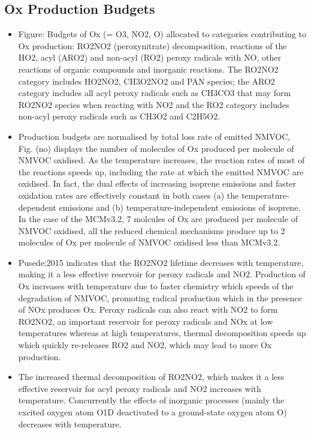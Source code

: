 \documentclass[11pt,a4paper]{article}
\begin{document}
\subsection{Ox Production Budgets}
\begin{itemize}
    \item Figure: Budgets of Ox (= O3, NO2, O) allocated to categories contributing to Ox production: RO2NO2 (peroxynitrate) decomposition, reactions of the HO2, acyl (ARO2) and non-acyl (RO2) peroxy radicals with NO, other reactions of organic compounds and inorganic reactions. The RO2NO2 category includes HO2NO2, CH3O2NO2 and PAN species; the ARO2 category includes all acyl peroxy radicals such as CH3CO3 that may form RO2NO2 species when reacting with NO2 and the RO2 category includes non-acyl peroxy radicals such as CH3O2 and C2H5O2.
    \item Production budgets are normalised by total loss rate of emitted NMVOC, Fig. (no) displays the number of molecules of Ox produced per molecule of NMVOC oxidised. As the temperature increases, the reaction rates of most of the reactions speeds up, including the rate at which the emitted NMVOC are oxidised. In fact, the dual effects of increasing isoprene emissions and faster oxidation rates are effectively constant in both cases (a) the temperature-dependent emissions and (b) temperature-independent emissions of isoprene. In the case of the MCMv3.2, 7 molcules of Ox are produced per molecule of NMVOC oxidised, all the reduced chemical mechanisms produce up to 2 molecules of Ox per molecule of NMVOC oxidised less than MCMv3.2.
    \item Pusede:2015 indicates that the RO2NO2 lifetime decreases with temperature, making it a less effective reservoir for peroxy radicals and NO2. Production of Ox increases with temperature due to faster chemistry which speeds of the degradation of NMVOC, promoting radical production which in the presence of NOx produces Ox. Peroxy radicals can also react with NO2 to form RO2NO2, an important reservoir for peroxy radicals and NOx at low temperatures whereas at high temperatures, thermal decomposition speeds up which quickly re-releases RO2 and NO2, which may lead to more Ox production.
    \item The increased thermal decomposition of RO2NO2, which makes it a less effective reservoir for acyl peroxy radicals and NO2 increases with temperature. Concurrently the effects of inorganic processes (mainly the excited oxygen atom O1D deactivated to a ground-state oxygen atom O) decreases with temperature.

\end{itemize}
\end{document}
